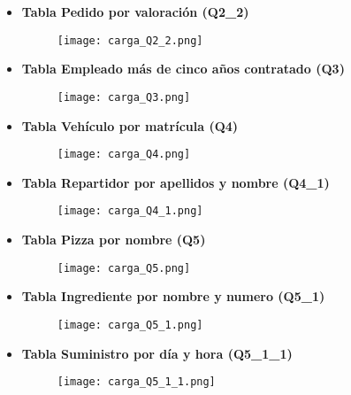 \documentclass[a4paper]{article}
\begin{document}
\begin{itemize}
    \item \textbf{\large{Tabla Pedido por valoración (Q2\_2)}}

    \begin{figure}[H]
        \texttt{[image: carga\_Q2\_2.png]}
        \label{fig:carga_Q2_2}
    \end{figure}

    \item \textbf{\large{Tabla Empleado más de cinco años contratado (Q3)}}

    \begin{figure}[H]
        \texttt{[image: carga\_Q3.png]}
        \label{fig:carga_Q3}
    \end{figure}

    \item \textbf{\large{Tabla Vehículo por matrícula (Q4)}}

    \begin{figure}[H]
        \texttt{[image: carga\_Q4.png]}
        \label{fig:carga_Q4}
    \end{figure}

    \item \textbf{\large{Tabla Repartidor por apellidos y nombre (Q4\_1)}}

    \begin{figure}[H]
        \texttt{[image: carga\_Q4\_1.png]}
        \label{fig:carga_Q4_1}
    \end{figure}

    \item \textbf{\large{Tabla Pizza por nombre (Q5)}}

    \begin{figure}[H]
        \texttt{[image: carga\_Q5.png]}
        \label{fig:carga_Q5}
    \end{figure}

    \item \textbf{\large{Tabla Ingrediente por nombre y numero (Q5\_1)}}

    \begin{figure}[H]
        \texttt{[image: carga\_Q5\_1.png]}
        \label{fig:carga_Q5_1}
    \end{figure}

    \item \textbf{\large{Tabla Suministro por día y hora (Q5\_1\_1)}}

    \begin{figure}[H]
        \texttt{[image: carga\_Q5\_1\_1.png]}
        \label{fig:carga_Q5_1_1}
    \end{figure}
        
\end{itemize}
\end{document}
